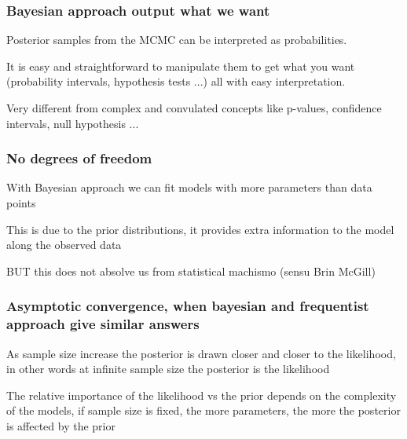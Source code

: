 \documentclass{beamer}
\begin{document}
 
  \begin{frame}
  \frametitle{\bf Bayesian approach output what we want}
  
  Posterior samples from the MCMC can be interpreted as probabilities.\\
  
  \vspace*{0.3cm}
  
  It is easy and straightforward to manipulate them to get what you want (probability intervals, hypothesis tests ...) all with easy interpretation.\\
  
  \vspace*{0.3cm}
  
  Very different from complex and convulated concepts like p-values, confidence intervals, null hypothesis ...
  
  
 \end{frame}
 
  \begin{frame}
  \frametitle{\bf No degrees of freedom}
  
  With Bayesian approach we can fit models with more parameters than data points
  
  \vspace*{0.3cm}
  
  This is due to the prior distributions, it provides extra information to the model along the observed data
  
  \vspace*{0.3cm}
  
  BUT this does not absolve us from statistical machismo (sensu Brin McGill)
  
 \end{frame}
 
  \begin{frame}
  \frametitle{\bf Asymptotic convergence, when bayesian and frequentist approach give similar answers}
  
  As sample size increase the posterior is drawn closer and closer to the likelihood, in other words at infinite sample size the posterior is the likelihood
  
  \vspace*{0.3cm}
  
  The relative importance of the likelihood vs the prior depends on the complexity of the models, if sample size is fixed, the more parameters, the more the posterior is affected by the prior
  
  
 \end{frame}
 
\end{document}
